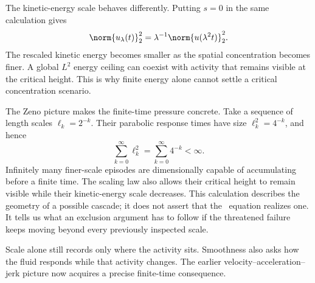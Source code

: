 The kinetic-energy scale behaves differently.
Putting \(s=0\) in the same calculation gives
\[
  \norm{u_\lambda(t)}_2^2
  =
  \lambda^{-1}
  \norm{u(\lambda^2t)}_2^2.
\]
The rescaled kinetic energy becomes smaller as the spatial concentration becomes finer.
A global \(L^2\) energy ceiling can coexist with activity that remains visible at the critical height.
This is why finite energy alone cannot settle a critical concentration scenario.

The Zeno picture makes the finite-time pressure concrete.
Take a sequence of length scales \(\ell_k=2^{-k}\).
Their parabolic response times have size \(\ell_k^2=4^{-k}\), and hence
\[
  \sum_{k=0}^{\infty}\ell_k^2
  =
  \sum_{k=0}^{\infty}4^{-k}
  <\infty.
\]
Infinitely many finer-scale episodes are dimensionally capable of accumulating before a finite time.
The scaling law also allows their critical height to remain visible while their kinetic-energy scale decreases.
This calculation describes the geometry of a possible cascade; it does not assert that the \NavierStokes\ equation realizes one.
It tells us what an exclusion argument has to follow if the threatened failure keeps moving beyond every previously inspected scale.

Scale alone still records only where the activity sits.
Smoothness also asks how the fluid responds while that activity changes.
The earlier velocity--acceleration--jerk picture now acquires a precise finite-time consequence.
